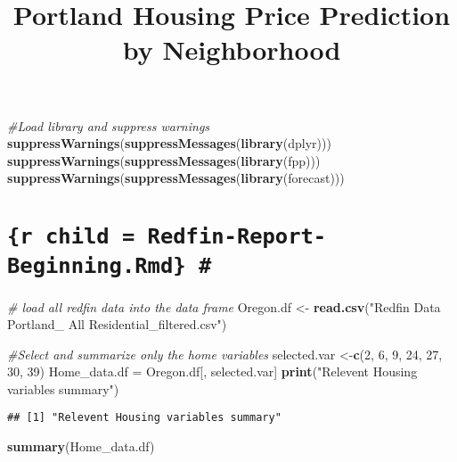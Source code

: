 \documentclass[]{article}
\title{Portland Housing Price Prediction by Neighborhood}
\author{}
\date{}
\newenvironment{Shaded}{\begin{snugshade}}{\end{snugshade}}
\newcommand{\KeywordTok}[1]{\textcolor[rgb]{0.13,0.29,0.53}{\textbf{#1}}}
\newcommand{\DecValTok}[1]{\textcolor[rgb]{0.00,0.00,0.81}{#1}}
\newcommand{\StringTok}[1]{\textcolor[rgb]{0.31,0.60,0.02}{#1}}
\newcommand{\CommentTok}[1]{\textcolor[rgb]{0.56,0.35,0.01}{\textit{#1}}}
\newcommand{\NormalTok}[1]{#1}
\begin{document}
\maketitle

\begin{Shaded}
\begin{Highlighting}[]
\CommentTok{#Load library and suppress warnings}
\KeywordTok{suppressWarnings}\NormalTok{(}\KeywordTok{suppressMessages}\NormalTok{(}\KeywordTok{library}\NormalTok{(dplyr)))}
\KeywordTok{suppressWarnings}\NormalTok{(}\KeywordTok{suppressMessages}\NormalTok{(}\KeywordTok{library}\NormalTok{(fpp)))}
\KeywordTok{suppressWarnings}\NormalTok{(}\KeywordTok{suppressMessages}\NormalTok{(}\KeywordTok{library}\NormalTok{(forecast)))}
\end{Highlighting}
\end{Shaded}

\section{\texorpdfstring{\texttt{\{r\ child\ =\ \textquotesingle{}Redfin-Report-Beginning.Rmd\textquotesingle{}\}\ \#}}{\{r child = 'Redfin-Report-Beginning.Rmd'\} \#}}\label{r-child-redfin-report-beginning.rmd}

\begin{Shaded}
\begin{Highlighting}[]
\CommentTok{# load all redfin data into the data frame}
\NormalTok{Oregon.df <-}\StringTok{ }\KeywordTok{read.csv}\NormalTok{(}\StringTok{"Redfin Data Portland_ All Residential_filtered.csv"}\NormalTok{)}

\CommentTok{#Select and summarize only the home variables}
\NormalTok{selected.var <-}\KeywordTok{c}\NormalTok{(}\DecValTok{2}\NormalTok{, }\DecValTok{6}\NormalTok{, }\DecValTok{9}\NormalTok{, }\DecValTok{24}\NormalTok{, }\DecValTok{27}\NormalTok{, }\DecValTok{30}\NormalTok{, }\DecValTok{39}\NormalTok{)}
\NormalTok{Home_data.df =}\StringTok{ }\NormalTok{Oregon.df[, selected.var]}
\KeywordTok{print}\NormalTok{(}\StringTok{"Relevent Housing variables summary"}\NormalTok{)}
\end{Highlighting}
\end{Shaded}

\begin{verbatim}
## [1] "Relevent Housing variables summary"
\end{verbatim}

\begin{Shaded}
\begin{Highlighting}[]
\KeywordTok{summary}\NormalTok{(Home_data.df)}
\end{Highlighting}
\end{Shaded}
\end{document}
